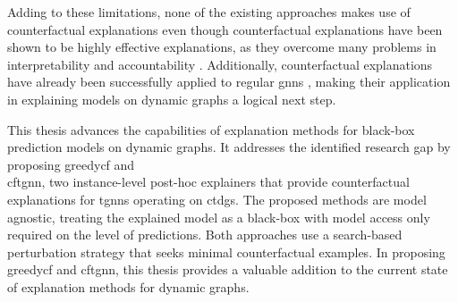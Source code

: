 Adding to these limitations, none of the existing approaches makes use of counterfactual explanations even though counterfactual explanations have been shown to be highly effective explanations, as they overcome many problems in interpretability and accountability \cite{wachter_counterfactual_2018}. Additionally, counterfactual explanations have already been successfully applied to regular \glspl{gnn} \cite{tan_learning_2022, lucic_cf-gnnexplainer_2022}, making their application in explaining models on dynamic graphs a logical next step.

This thesis advances the capabilities of explanation methods for black-box prediction models on dynamic graphs. It addresses the identified research gap by proposing \acrfull{greedycf} and \\ \acrfull{cftgnn}, two instance-level post-hoc explainers that provide counterfactual explanations for \glspl{tgnn} operating on \glspl{ctdg}. The proposed methods are model agnostic, treating the explained model as a black-box with model access only required on the level of predictions. Both approaches use a search-based perturbation strategy that seeks minimal counterfactual examples. In proposing \gls{greedycf} and \gls{cftgnn}, this thesis provides a valuable addition to the current state of explanation methods for dynamic graphs.


